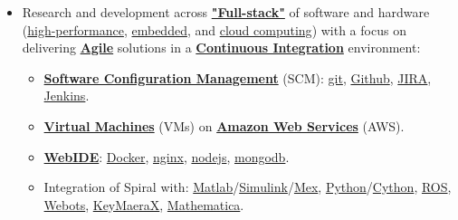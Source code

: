 \documentclass{article}
\begin{document}
\begin{itemize}
      \item Research and development across \textbf{\href{https://www.google.com/search?q=full+stack+software&oq=full+stack+software&aqs=chrome..69i57.2623j0j7&sourceid=chrome&es_sm=122&ie=UTF-8}{"Full-stack"}} of software and hardware (\href{https://en.wikipedia.org/wiki/Supercomputer}{high-performance}, \href{https://en.wikipedia.org/wiki/Embedded_system}{embedded}, and \href{https://en.wikipedia.org/wiki/Cloud_computing}{cloud computing}) with a focus on delivering \textbf{\href{https://en.wikipedia.org/wiki/Agile_software_development}{Agile}} solutions in a \textbf{\href{http://en.wikipedia.org/wiki/Continuous_integration}{Continuous Integration}} environment:
      \begin{itemize}
        \item \textbf{\href{https://en.wikipedia.org/wiki/Software_configuration_management}{Software Configuration Management}} (SCM): \href{https://git-scm.com/}{git}, \href{https://github.com/spiralgen}{Github}, \href{https://www.atlassian.com/software/jira}{JIRA}, \href{http://jenkins-ci.org/}{Jenkins}.
        \item \textbf{\href{https://en.wikipedia.org/wiki/Virtual_machine}{Virtual Machines}} (VMs) on \textbf{\href{https://en.wikipedia.org/wiki/Amazon_Web_Services}{Amazon Web Services}} (AWS).
        \item \textbf{\href{https://dzone.com/articles/who-needs-online-ide}{WebIDE}}: \href{https://www.docker.com/}{Docker}, \href{https://www.nginx.com/resources/wiki/}{nginx}, \href{https://nodejs.org/en/}{nodejs}, \href{https://www.mongodb.org/}{mongodb}. 
        \item Integration of Spiral with: \href{http://www.mathworks.com/products/matlab/}{Matlab}/\href{http://www.mathworks.com/products/simulink/}{Simulink}/\href{http://www.mathworks.com/help/matlab/ref/mex.html}{Mex}, \href{https://www.python.org/}{Python}/\href{http://cython.org/}{Cython}, \href{http://www.ros.org/}{ROS}, \href{https://www.cyberbotics.com/overview}{Webots}, \href{http://www.ls.cs.cmu.edu/KeYmaeraX/}{KeyMaeraX}, \href{http://www.wolfram.com/mathematica/}{Mathematica}.
      \end{itemize}
    \end{itemize}


\end{document}
